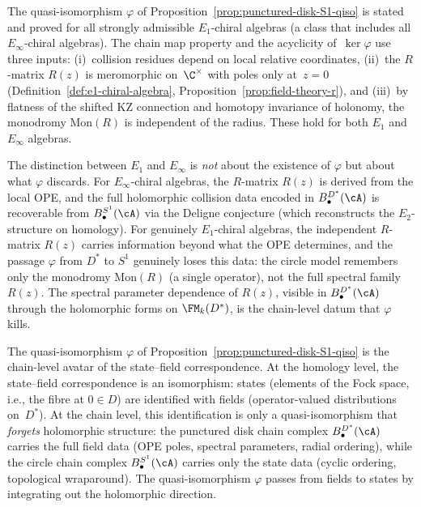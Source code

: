 \begin{remark}%
\label{rem:punctured-disk-S1-E1-gap}%
%
%
The quasi-isomorphism $\varphi$ of
Proposition~\ref{prop:punctured-disk-S1-qiso} is stated
and proved for all strongly admissible $E_1$-chiral
algebras (a class that includes all $E_\infty$-chiral
algebras). The chain map property and the acyclicity
of~$\ker\varphi$ use three inputs:
(i)~collision residues depend on local relative
coordinates,
(ii)~the $R$-matrix $R(z)$ is meromorphic on~$\C^\times$
with poles only at~$z=0$
(Definition~\ref{def:e1-chiral-algebra},
Proposition~\ref{prop:field-theory-r}), and
(iii)~by flatness of the shifted KZ connection
and homotopy invariance of holonomy, the monodromy
$\mathrm{Mon}(R)$ is independent of the radius.
These hold for both $E_1$ and $E_\infty$ algebras.

The distinction between $E_1$ and $E_\infty$ is
\emph{not} about the existence of $\varphi$ but about
what $\varphi$ discards. For $E_\infty$-chiral
algebras, the $R$-matrix $R(z)$ is derived from the
local OPE, and the full holomorphic collision data
encoded in $B^{D^*}_\bullet(\cA)$ is recoverable from
$B^{S^1}_\bullet(\cA)$ via the Deligne conjecture
(which reconstructs the $E_2$-structure on homology).
For genuinely $E_1$-chiral algebras, the independent
$R$-matrix $R(z)$ carries information beyond what the
OPE determines, and the passage $\varphi$ from $D^*$
to $S^1$ genuinely loses this data: the circle model
remembers only the monodromy $\mathrm{Mon}(R)$ (a
single operator), not the full spectral family
$R(z)$. The spectral parameter dependence of
$R(z)$, visible in $B^{D^*}_\bullet(\cA)$ through
the holomorphic forms on $\FM_k(D^*)$, is the
chain-level datum that $\varphi$ kills.
\end{remark}

\begin{remark}%
\label{rem:state-field-chain-level}%
%
The quasi-isomorphism $\varphi$ of
Proposition~\ref{prop:punctured-disk-S1-qiso}
is the chain-level avatar of the state--field
correspondence. At the homology level, the
state--field correspondence is an isomorphism:
states (elements of the Fock space, i.e., the
fibre at $0\in D$) are identified with fields
(operator-valued distributions on~$D^*$). At
the chain level, this identification is only a
quasi-isomorphism that \emph{forgets} holomorphic
structure: the punctured disk chain complex
$B^{D^*}_\bullet(\cA)$ carries the full field
data (OPE poles, spectral parameters, radial
ordering), while the circle chain complex
$B^{S^1}_\bullet(\cA)$ carries only the state
data (cyclic ordering, topological wraparound).
The quasi-isomorphism $\varphi$ passes from fields
to states by integrating out the holomorphic
direction.
\end{remark}

